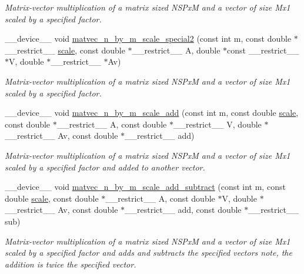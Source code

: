 \begin{DoxyCompactItemize}
\begin{DoxyCompactList}\small\item\em Matrix-\/vector multiplication of a matrix sized N\+S\+PxM and a vector of size Mx1 scaled by a specified factor. \end{DoxyCompactList}\item 
\+\_\+\+\_\+device\+\_\+\+\_\+ void \hyperlink{exponential__linear__algebra_8cu_a6d511f330da8ea1a044ed327a132d290}{matvec\+\_\+n\+\_\+by\+\_\+m\+\_\+scale\+\_\+special2} (const int m, const double $\ast$\+\_\+\+\_\+restrict\+\_\+\+\_\+ \hyperlink{inverse_8cu_adbb4f3f3af5f968a94f717729803c88d}{scale}, const double $\ast$\+\_\+\+\_\+restrict\+\_\+\+\_\+ A, double $\ast$const \+\_\+\+\_\+restrict\+\_\+\+\_\+ $\ast$V, double $\ast$\+\_\+\+\_\+restrict\+\_\+\+\_\+ $\ast$Av)
\begin{DoxyCompactList}\small\item\em Matrix-\/vector multiplication of a matrix sized N\+S\+PxM and a vector of size Mx1 scaled by a specified factor. \end{DoxyCompactList}\item 
\+\_\+\+\_\+device\+\_\+\+\_\+ void \hyperlink{exponential__linear__algebra_8cu_a03a4bb64bc60aab5af9a5f5b40205ede}{matvec\+\_\+n\+\_\+by\+\_\+m\+\_\+scale\+\_\+add} (const int m, const double \hyperlink{inverse_8cu_adbb4f3f3af5f968a94f717729803c88d}{scale}, const double $\ast$\+\_\+\+\_\+restrict\+\_\+\+\_\+ A, const double $\ast$\+\_\+\+\_\+restrict\+\_\+\+\_\+ V, double $\ast$\+\_\+\+\_\+restrict\+\_\+\+\_\+ Av, const double $\ast$\+\_\+\+\_\+restrict\+\_\+\+\_\+ add)
\begin{DoxyCompactList}\small\item\em Matrix-\/vector multiplication of a matrix sized N\+S\+PxM and a vector of size Mx1 scaled by a specified factor and added to another vector. \end{DoxyCompactList}\item 
\+\_\+\+\_\+device\+\_\+\+\_\+ void \hyperlink{exponential__linear__algebra_8cu_a0522be133cda40ce325a2af6d95daddb}{matvec\+\_\+n\+\_\+by\+\_\+m\+\_\+scale\+\_\+add\+\_\+subtract} (const int m, const double \hyperlink{inverse_8cu_adbb4f3f3af5f968a94f717729803c88d}{scale}, const double $\ast$\+\_\+\+\_\+restrict\+\_\+\+\_\+ A, const double $\ast$V, double $\ast$\+\_\+\+\_\+restrict\+\_\+\+\_\+ Av, const double $\ast$\+\_\+\+\_\+restrict\+\_\+\+\_\+ add, const double $\ast$\+\_\+\+\_\+restrict\+\_\+\+\_\+ sub)
\begin{DoxyCompactList}\small\item\em Matrix-\/vector multiplication of a matrix sized N\+S\+PxM and a vector of size Mx1 scaled by a specified factor and adds and subtracts the specified vectors note, the addition is twice the specified vector. \end{DoxyCompactList}\item 

\end{DoxyCompactItemize}
